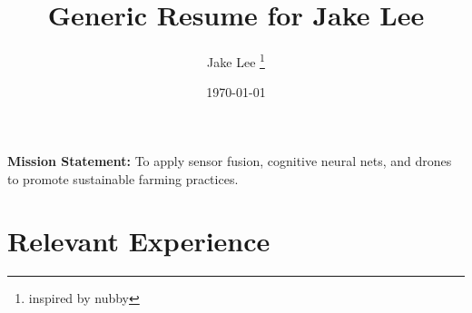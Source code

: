 \documentclass[12pt, letterpaper]{article}
\title{Generic Resume for Jake Lee}
\author{Jake Lee \thanks{inspired by nubby}}
\date{\today}
\begin{document}
  \begin{flushright}
    \parbox{0.5\textwidth}{
      \textbf{Mission Statement:} To apply sensor fusion, cognitive neural nets, and drones to promote sustainable farming practices.
    }
  \end{flushright}

  \begin{flushleft}
    \noindent
    \setlength{\fboxsep}{1cm}
  \end{flushleft}

  \section*{Relevant Experience}
  
\end{document}
